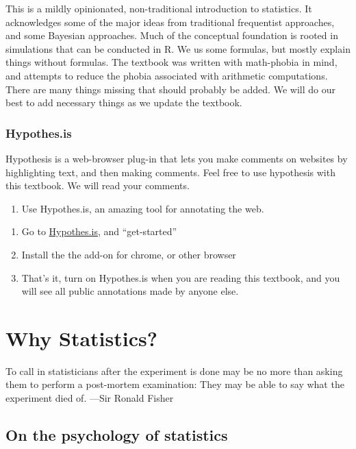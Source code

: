 \documentclass[]{book}
\providecommand{\tightlist}{%
  \setlength{\itemsep}{0pt}\setlength{\parskip}{0pt}}
\begin{document}
This is a mildly opinionated, non-traditional introduction to statistics. It acknowledges some of the major ideas from traditional frequentist approaches, and some Bayesian approaches. Much of the conceptual foundation is rooted in simulations that can be conducted in R. We us some formulas, but mostly explain things without formulas. The textbook was written with math-phobia in mind, and attempts to reduce the phobia associated with arithmetic computations. There are many things missing that should probably be added. We will do our best to add necessary things as we update the textbook.

\hypertarget{hypothes.is}{%
\subsection{Hypothes.is}\label{hypothes.is}}

Hypothesis is a web-browser plug-in that lets you make comments on websites by highlighting text, and then making comments. Feel free to use hypothesis with this textbook. We will read your comments.

\begin{enumerate}
\def\labelenumi{\arabic{enumi}.}
\tightlist
\item
  Use Hypothes.is, an amazing tool for annotating the web.
\end{enumerate}

\begin{enumerate}
\def\labelenumi{\alph{enumi}.}
\item
  Go to \href{https://web.hypothes.is/}{Hypothes.is}, and ``get-started''
\item
  Install the the add-on for chrome, or other browser
\item
  That's it, turn on Hypothes.is when you are reading this textbook, and you will see all public annotations made by anyone else.
\end{enumerate}

\hypertarget{why-statistics}{%
\chapter{Why Statistics?}\label{why-statistics}}

{
To call in statisticians after the experiment is done may be no more than asking them to perform a post-mortem examination: They may be able to say what the experiment died of.
---Sir Ronald Fisher
}

\hypertarget{on-the-psychology-of-statistics}{%
\section{On the psychology of statistics}\label{on-the-psychology-of-statistics}}
\end{document}
